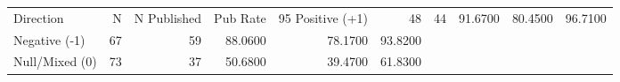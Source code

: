 \begin{tabular}{lrrrrr}
\toprule
Direction & N & N Published & Pub Rate & 95%
\midrule
Positive (+1) & 48 & 44 & 91.6700 & 80.4500 & 96.7100 \\
Negative (-1) & 67 & 59 & 88.0600 & 78.1700 & 93.8200 \\
Null/Mixed (0) & 73 & 37 & 50.6800 & 39.4700 & 61.8300 \\
\bottomrule
\end{tabular}
